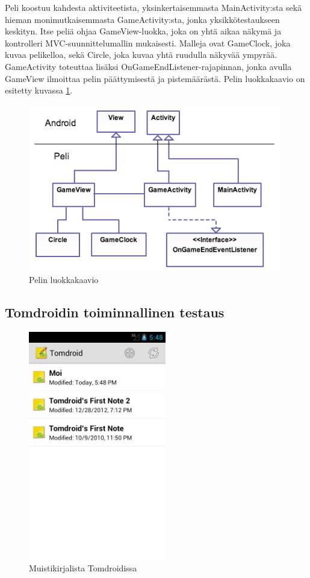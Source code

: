 Peli koostuu kahdesta aktiviteetista, yksinkertaisemmasta MainActivity:sta sekä hieman monimutkaisemmasta GameActivity:sta, jonka yksikkötestaukseen keskityn. Itse peliä ohjaa GameView-luokka, joka on yhtä aikaa näkymä ja kontrolleri MVC-suunnittelumallin mukaisesti. Malleja ovat GameClock, joka kuvaa pelikelloa, sekä Circle, joka kuvaa yhtä ruudulla näkyvää ympyrää. GameActivity toteuttaa lisäksi OnGameEndListener-rajapinnan, jonka avulla GameView ilmoittaa pelin päättymisestä ja pistemäärästä. Pelin luokkakaavio on esitetty kuvassa \ref{game_classdiagram}.

\begin{figure}[htb]
\includegraphics[width=110mm]{peli_luokkakaavio.png}
\caption{Pelin luokkakaavio} \label{game_classdiagram}
\end{figure}

\subsection{Tomdroidin toiminnallinen testaus}

\begin{figure}[htb]
\includegraphics[width=60mm]{tomdroid_notelist.png}
\caption{Muistikirjalista Tomdroidissa} \label{tomdroid_notelist}
\end{figure}

